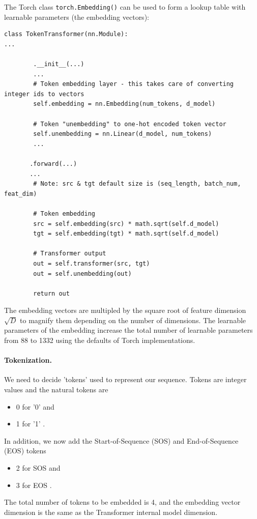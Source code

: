 \documentclass[final]{article}
\begin{document}
The Torch class \texttt{torch.Embedding()} can be used to form a
lookup table with learnable parameters (the embedding vectors):
\begin{lstlisting}
class TokenTransformer(nn.Module):
...

        .__init__(...)
        ...
        # Token embedding layer - this takes care of converting integer ids to vectors
        self.embedding = nn.Embedding(num_tokens, d_model)

        # Token "unembedding" to one-hot encoded token vector
        self.unembedding = nn.Linear(d_model, num_tokens)
        ...
        
       .forward(...)
       ...
        # Note: src & tgt default size is (seq_length, batch_num, feat_dim)

        # Token embedding
        src = self.embedding(src) * math.sqrt(self.d_model)
        tgt = self.embedding(tgt) * math.sqrt(self.d_model)        

        # Transformer output
        out = self.transformer(src, tgt)
        out = self.unembedding(out)
        
        return out
\end{lstlisting}
The embedding vectors are multipled by the square root of feature
dimension $\sqrt{D}$ to magnify them depending on the number of
dimensions. The learnable parameters of the embedding increase the
total number of learnable parameters from 88 to 1332 using the
defaults of Torch implementations.

\paragraph{Tokenization.} We need to decide 'tokens' used to represent
our sequence. Tokens are integer values and the natural tokens are
\begin{itemize}
\item 0 for '0' and
\item 1 for '1' .
\end{itemize}
In addition, we now add the Start-of-Sequence (SOS) and
End-of-Sequence (EOS) tokens 
\begin{itemize}
\item 2 for SOS and
\item 3 for EOS .
\end{itemize}
The total number of tokens to be embedded is 4, and the embedding
vector dimension is the same as the Transformer internal model
dimension.
\end{document}
